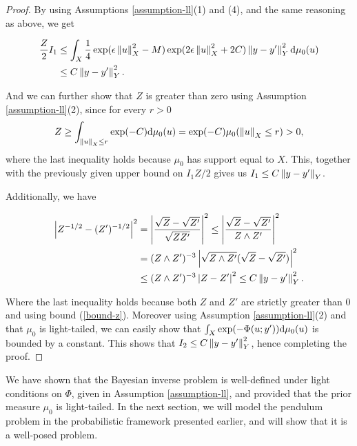 \begin{proof}
  By using Assumptions \ref{assumption-ll}(1) and (4), and the same reasoning as above, we get

  \begin{equation*}
    \begin{aligned}
      \frac{Z}2I_1 &\le \int_X\frac14\exp(\epsilon\left\lVert u\right\rVert_X^2 - M)\exp(2\epsilon\left\lVert u\right\rVert_X^2 + 2C)\left\lVert y - y'\right\rVert_Y^2 \text{d}\mu_0(u)\\
        & \le C\left\lVert y - y'\right\rVert_Y^2.
    \end{aligned}
  \end{equation*}

  And we can further show that $Z$ is greater than zero using Assumption \ref{assumption-ll}(2), since for every $r > 0$
  \begin{equation*}
    Z \ge \int_{\left\lVert u\right\rVert_X \le r}\exp(-C)\text{d}\mu_0(u) = \exp(-C)\mu_0(\left\lVert u\right\rVert_X \le r) > 0,
  \end{equation*}
  where the last inequality holds because $\mu_0$ has support equal to $X$. This, together with the previously given upper bound on $I_1 Z/2$ gives us $I_1 \le C\left\lVert y - y'\right\rVert_Y$.

  Additionally, we have

  \begin{align*}
    \left|Z^{-1/2} - (Z')^{-1/2}\right|^2
    &= \left|\frac{\sqrt{Z} - \sqrt{Z'}}{\sqrt{ZZ'}}\right|^2 \leq \left|\frac{\sqrt{Z} - \sqrt{Z'}}{Z \land Z'}\right|^2 \\
    &= (Z \land Z')^{-3}\left|\sqrt{Z \land Z'}(\sqrt{Z} - \sqrt{Z'})\right|^2\\
    &\le (Z \land Z')^{-3}\left|Z - Z'\right|^2 \le C\left\lVert y - y'\right\rVert_Y^2.
  \end{align*}

  Where the last inequality holds because both $Z$ and $Z'$ are strictly greater than $0$ and using bound (\ref{bound-z}). Moreover using Assumption \ref{assumption-ll}(2) and that $\mu_0$ is light-tailed, we can easily show that $\int_X\exp(-\Phi(u; y'))\text{d}\mu_0(u)$ is bounded by a constant. This shows that $I_2 \le C\left\lVert y - y'\right\rVert_Y^2$, hence completing the proof.
\end{proof}

We have shown that the Bayesian inverse problem is well-defined under light conditions on $\Phi$, given in Assumption \ref{assumption-ll}, and provided that the prior measure $\mu_0$ is light-tailed. In the next section, we will model the pendulum problem in the probabilistic framework presented earlier, and will show that it is a well-posed problem.

